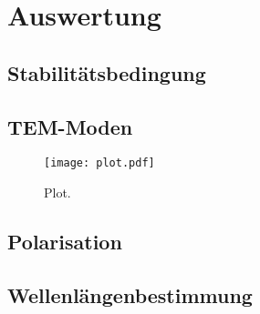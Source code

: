 \section{Auswertung}
\label{sec:Auswertung}



\subsection{Stabilitätsbedingung}
\label{subsec:Stabil}

\subsection{TEM-Moden}
\label{}

\begin{figure}
  \centering
  \texttt{[image: plot.pdf]}
  \caption{Plot.}
  \label{fig:plot}
\end{figure}


\subsection{Polarisation}
\label{subsec:Polarisation}

\subsection{Wellenlängenbestimmung}
\label{subsec:
}

